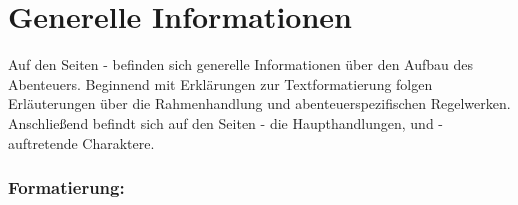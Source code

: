 \thispagestyle{fancy-info}
\section*{Generelle Informationen}

Auf den Seiten \pageref{info-start}-\pageref{info-end} befinden sich generelle Informationen über den Aufbau des Abenteuers. Beginnend mit Erklärungen zur
Textformatierung folgen Erläuterungen über die Rahmenhandlung und abenteuerspezifischen Regelwerken. Anschließend befindt sich auf den Seiten
\pageref{adv-start}-\pageref{adv-end} die Haupthandlungen, und \pageref{char-start}-\pageref{char-end} auftretende Charaktere.


\subsubsection*{Formatierung:}

